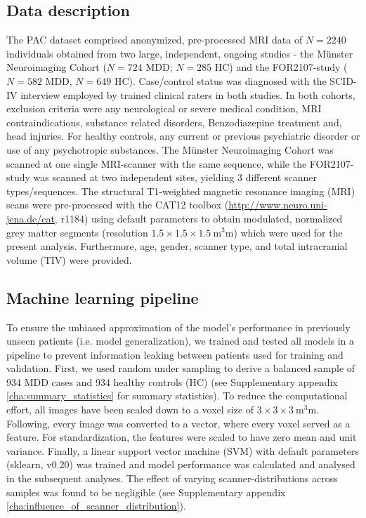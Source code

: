 \documentclass{article}
\begin{document}
    \subsection{Data description}
    The PAC dataset comprised anonymized, pre-processed MRI data of $N=\num{2240}$ individuals obtained from two large, independent, ongoing studies - the Münster Neuroimaging Cohort\cite{Dannlowski2015,Dannlowski2015a} ($N=\num{724}$ MDD; $N=\num{285}$ HC) and the FOR2107-study\cite{Kircher2018} ($N=\num{582}$ MDD, $N=\num{649}$ HC). Case/control status was diagnosed with the SCID-IV\cite{Wittchen1997} interview employed by trained clinical raters in both studies. In both cohorts, exclusion criteria were any neurological or severe medical condition, MRI contraindications, substance related disorders, Benzodiazepine treatment and, head injuries. For healthy controls, any current or previous psychiatric disorder or use of any psychotropic substances. The Münster Neuroimaging Cohort was scanned at one single MRI-scanner with the same sequence, while the FOR2107-study was scanned at two independent sites\cite{Vogelbacher2018}, yielding \num{3} different scanner types/sequences. The structural T1-weighted magnetic resonance imaging (MRI) scans were pre-processed with the CAT12 toolbox (\url{http://www.neuro.uni-jena.de/cat}, r1184) using default parameters to obtain modulated, normalized grey matter segments (resolution $\num{1.5} \times \num{1.5} \times \SI{1.5}{\cubic\milli\meter}$) which were used for the present analysis. Furthermore, age, gender, scanner type, and total intracranial volume (TIV) were provided.

    \subsection{Machine learning pipeline}
    To ensure the unbiased approximation of the model’s performance in previously unseen patients (i.e. model generalization), we trained and tested all models in a pipeline to prevent information leaking between patients used for training and validation. First, we used random under sampling to derive a balanced sample of \num{934} MDD cases and \num{934} healthy controls (HC) (see Supplementary appendix \ref{cha:summary_statistics} for summary statistics). To reduce the computational effort, all images have been scaled down to a voxel size of  $\num{3} \times \num{3} \times \SI{3}{\cubic\milli\meter}$. Following, every image was converted to a vector, where every voxel served as a feature. For standardization, the features were scaled to have zero mean and unit variance. Finally, a linear support vector machine (SVM) with default parameters (sklearn\cite{Scikit-learn2018}, v0.20) was trained and model performance was calculated and analysed in the subsequent analyses. The effect of varying scanner-distributions across samples was found to be negligible (see Supplementary appendix \ref{cha:influence_of_scanner_distribution}).
\end{document}
